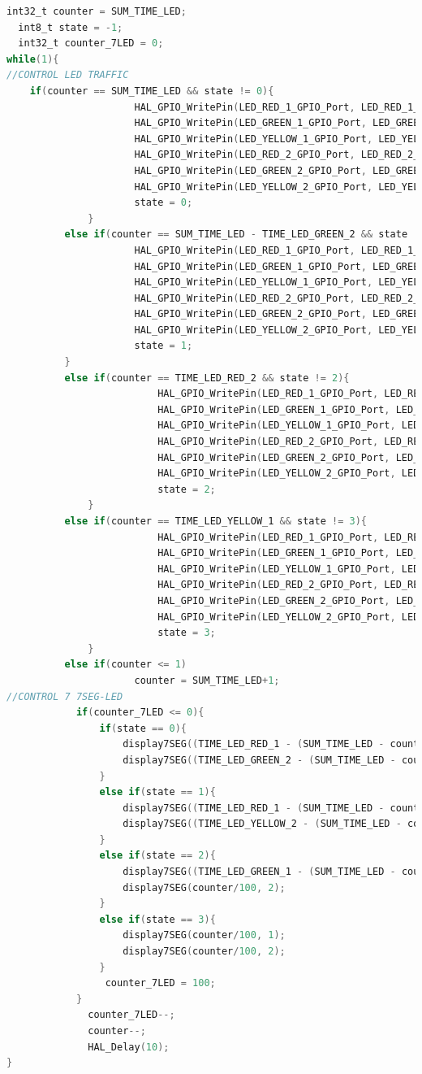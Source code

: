 \documentclass[twoside, final]{hcmut_report}
\begin{document}
\begin{lstlisting}[language=C, caption=Source code for Exercise 5]
  int32_t counter = SUM_TIME_LED;
  int8_t state = -1;
  int32_t counter_7LED = 0;
while(1){
//CONTROL LED TRAFFIC
    if(counter == SUM_TIME_LED && state != 0){
			  		  HAL_GPIO_WritePin(LED_RED_1_GPIO_Port, LED_RED_1_Pin, 0);
			  		  HAL_GPIO_WritePin(LED_GREEN_1_GPIO_Port, LED_GREEN_1_Pin, 1);
			  		  HAL_GPIO_WritePin(LED_YELLOW_1_GPIO_Port, LED_YELLOW_1_Pin, 1);
			  	  	  HAL_GPIO_WritePin(LED_RED_2_GPIO_Port, LED_RED_2_Pin, 1);
					  HAL_GPIO_WritePin(LED_GREEN_2_GPIO_Port, LED_GREEN_2_Pin, 0);
					  HAL_GPIO_WritePin(LED_YELLOW_2_GPIO_Port, LED_YELLOW_2_Pin, 1);
		  	  		  state = 0;
		  	  }
		  else if(counter == SUM_TIME_LED - TIME_LED_GREEN_2 && state != 1){
	  		  	  	  HAL_GPIO_WritePin(LED_RED_1_GPIO_Port, LED_RED_1_Pin, 0);
	  		  	  	  HAL_GPIO_WritePin(LED_GREEN_1_GPIO_Port, LED_GREEN_1_Pin, 1);
	  		  	  	  HAL_GPIO_WritePin(LED_YELLOW_1_GPIO_Port, LED_YELLOW_1_Pin, 1);
	  	  	  	  	  HAL_GPIO_WritePin(LED_RED_2_GPIO_Port, LED_RED_2_Pin, 1);
	  	  	  	  	  HAL_GPIO_WritePin(LED_GREEN_2_GPIO_Port, LED_GREEN_2_Pin, 1);
	  	  	  	  	  HAL_GPIO_WritePin(LED_YELLOW_2_GPIO_Port, LED_YELLOW_2_Pin, 0);
	  	  	  	  	  state = 1;
		  }
		  else if(counter == TIME_LED_RED_2 && state != 2){
		  		  		  HAL_GPIO_WritePin(LED_RED_1_GPIO_Port, LED_RED_1_Pin, 1);
		  		  		  HAL_GPIO_WritePin(LED_GREEN_1_GPIO_Port, LED_GREEN_1_Pin, 0);
		  		  		  HAL_GPIO_WritePin(LED_YELLOW_1_GPIO_Port, LED_YELLOW_1_Pin, 1);
		  	  	  	  	  HAL_GPIO_WritePin(LED_RED_2_GPIO_Port, LED_RED_2_Pin, 0);
		  	  	  	  	  HAL_GPIO_WritePin(LED_GREEN_2_GPIO_Port, LED_GREEN_2_Pin, 1);
		  	  	  	  	  HAL_GPIO_WritePin(LED_YELLOW_2_GPIO_Port, LED_YELLOW_2_Pin, 1);
	  	  		  		  state = 2;
		  	  }
		  else if(counter == TIME_LED_YELLOW_1 && state != 3){
			  		   	  HAL_GPIO_WritePin(LED_RED_1_GPIO_Port, LED_RED_1_Pin, 1);
			  		   	  HAL_GPIO_WritePin(LED_GREEN_1_GPIO_Port, LED_GREEN_1_Pin, 1);
			  		   	  HAL_GPIO_WritePin(LED_YELLOW_1_GPIO_Port, LED_YELLOW_1_Pin, 0);
		  	  	  	  	  HAL_GPIO_WritePin(LED_RED_2_GPIO_Port, LED_RED_2_Pin, 0);
		  	  	  	  	  HAL_GPIO_WritePin(LED_GREEN_2_GPIO_Port, LED_GREEN_2_Pin, 1);
		  	  	  	  	  HAL_GPIO_WritePin(LED_YELLOW_2_GPIO_Port, LED_YELLOW_2_Pin, 1);
			  		   	  state = 3;
		  	  }
		  else if(counter <= 1)
		  	  		  counter = SUM_TIME_LED+1;
//CONTROL 7 7SEG-LED
		  	if(counter_7LED <= 0){
		  		if(state == 0){
				  	display7SEG((TIME_LED_RED_1 - (SUM_TIME_LED - counter))/100, 1);
				  	display7SEG((TIME_LED_GREEN_2 - (SUM_TIME_LED - counter))/100, 2);
		  		}
		  		else if(state == 1){
				  	display7SEG((TIME_LED_RED_1 - (SUM_TIME_LED - counter))/100, 1);
				  	display7SEG((TIME_LED_YELLOW_2 - (SUM_TIME_LED - counter - TIME_LED_GREEN_2))/100, 2);
		  		}
		  		else if(state == 2){
				  	display7SEG((TIME_LED_GREEN_1 - (SUM_TIME_LED - counter - TIME_LED_RED_1))/100, 1);
				  	display7SEG(counter/100, 2);
		  		}
		  		else if(state == 3){
		  			display7SEG(counter/100, 1);
		  			display7SEG(counter/100, 2);
		  		}
			  	 counter_7LED = 100;
		  	}
		  	  counter_7LED--;
		  	  counter--;
		  	  HAL_Delay(10);
}
\end{lstlisting}
\end{document}
